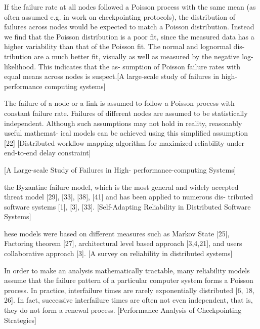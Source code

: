 \documentclass{cslthse-msc}
\begin{document}
If the failure rate at all nodes followed a Poisson process with the same mean (as often assumed e.g. in work on checkpointing protocols), the distribution of failures across nodes would be expected to match a Poisson distribution. Instead we find that the Poisson distribution is a poor fit, since the measured data has a higher variability than that of the Poisson fit. The normal and lognormal dis- tribution are a much better fit, visually as well as measured by the negative log-likelihood. This indicates that the as- sumption of Poisson failure rates with equal means across nodes is suspect.[A large-scale study of failures in high-performance computing systems]



The failure of a node or a link is assumed to follow a Poisson process with constant failure rate. Failures of different nodes are assumed to be statistically independent. Although such assumptions may not hold in reality, reasonably useful mathemat- ical models can be achieved using this simplified assumption [22] [Distributed workflow mapping algorithm for maximized reliability under end-to-end delay constraint]

[A Large-scale Study of Failures in High- performance-computing Systems]

the Byzantine failure model, which is the most general and widely accepted threat model [29], [33], [38], [41] and has been applied to numerous dis- tributed software systems [1], [3], [33]. [Self-Adapting Reliability in Distributed Software Systems]

hese models were based on different measures such as Markov State [25], Factoring theorem [27], architectural level based approach [3,4,21], and users collaborative approach [3]. [A survey on reliability in distributed systems]

In order to make an analysis mathematically tractable, many reliability models assume that the failure pattern of a particular computer system forms a Poisson process. In practice, interfailure times are rarely exponentially distributed [6, 18, 26]. In fact, successive interfailure times are often not even independent, that is, they do not form a renewal process. [Performance Analysis of Checkpointing Strategies]
\end{document}
